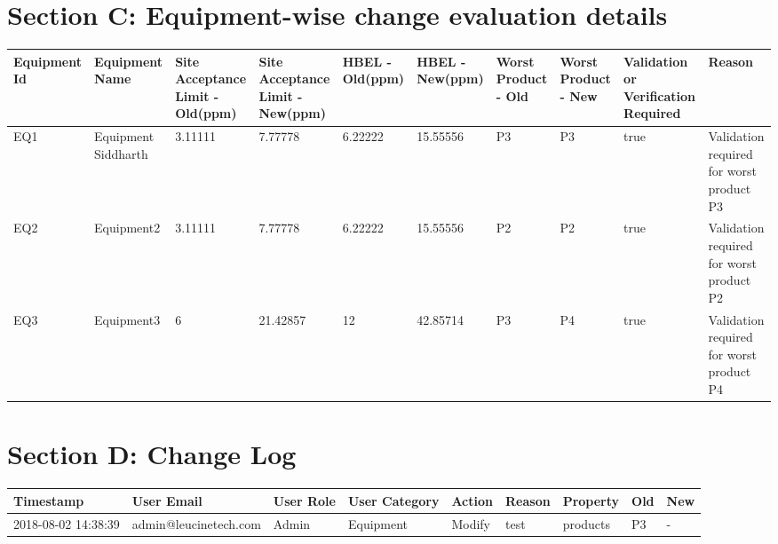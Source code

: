 \documentclass{article}
\begin{document}
\section{Section C: Equipment-wise change evaluation details}
    \scriptsize\begin{longtable}[l]{|p{1.1cm}|p{1.5cm}|p{1.7cm}|p{1.7cm}|p{1.2cm}|p{1.2cm}|p{1.2cm}|p{1.2cm}|p{1.5cm}|p{2cm}|}\hline
    Equipment Id& Equipment Name&Site Acceptance Limit - Old(ppm)&Site Acceptance Limit - New(ppm)&HBEL - Old(ppm)&HBEL - New(ppm)&Worst Product - Old&Worst Product - New& Validation or Verification Required&Reason\\\hline
    EQ1&Equipment Siddharth&3.11111&7.77778&6.22222&15.55556&P3&P3&true&Validation required for worst product P3\\\hline
    EQ2&Equipment2&3.11111&7.77778&6.22222&15.55556&P2&P2&true&Validation required for worst product P2\\\hline
    EQ3&Equipment3&6&21.42857&12&42.85714&P3&P4&true&Validation required for worst product P4\\\hline
\end{longtable}
\normalsize
\newpage
\section{Section D: Change Log}
\begin{longtable}[l]{|l|l|l|l|l|l|l|l|l|}\hline
Timestamp&User Email&User Role&User Category&Action&Reason&Property&Old&New\\\hline
2018-08-02 14:38:39&admin@leucinetech.com&Admin&Equipment&Modify&test&products&P3&-\\\hline
\end{longtable}
\end{document}
